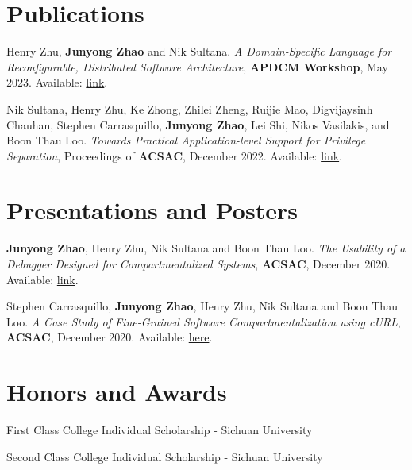 \documentclass{article}
\begin{document}
\section{Publications}
\begin{description}[font=$\bullet$,leftmargin=!]
  \item \small{Henry Zhu, \textbf{Junyong Zhao} and Nik Sultana. \textit{A
            Domain-Specific Language for Reconfigurable, Distributed Software
            Architecture}, \textbf{APDCM Workshop}, May 2023. Available:
          \href{https://apdcm.iss-j.org/doku.php?id=accepted2023}{link}.}
  \item \small{Nik Sultana, Henry Zhu, Ke Zhong, Zhilei Zheng, Ruijie Mao,
          Digvijaysinh Chauhan, Stephen Carrasquillo, \textbf{Junyong Zhao}, Lei
          Shi, Nikos Vasilakis, and Boon Thau Loo. \textit{Towards Practical
            Application-level Support for Privilege Separation}, Proceedings of
          \textbf{ACSAC}, December 2022. Available:
          \href{https://dl.acm.org/doi/pdf/10.1145/3564625.3564664}{link}.}
\end{description}

\vspace{-2pt}
\section{Presentations and Posters}
\begin{description}[font=$\bullet$,leftmargin=!]
  \item \small{\textbf{Junyong Zhao}, Henry Zhu, Nik Sultana and Boon Thau Loo.
          \textit{The Usability of a Debugger Designed for Compartmentalized
            Systems}, \textbf{ACSAC}, December 2020. Available:
          \href{https://www.acsac.org/2020/program/poster-wips/2020-poster-09\%20The\%20Usability\%20of\%20a\%20Debugger\%20Designed\%20for\%20Compartmentalized\%20Systems.pdf}{link}.
        }
  \item \small{Stephen Carrasquillo, \textbf{Junyong Zhao}, Henry Zhu, Nik
          Sultana and Boon Thau Loo. \textit{A Case Study of Fine-Grained
            Software Compartmentalization using cURL}, \textbf{ACSAC}, December
          2020. Available:
          \href{https://www.acsac.org/2020/program/poster-wips/2020-poster-10-A\%20Case\%20Study\%20of\%20Fine-Grained\%20Software\%20Compartmentalization\%20using\%20cURL.pdf}{here}.
        }
\end{description}

\vspace{-2pt}
\section{Honors and Awards}
\begin{description}[font=$\bullet$]
  \item \small{First Class College Individual Scholarship - Sichuan University}
        \vspace{-5pt}
  \item \small{Second Class College Individual Scholarship - Sichuan University}
        \vspace{-5pt}
\end{description}
\end{document}
